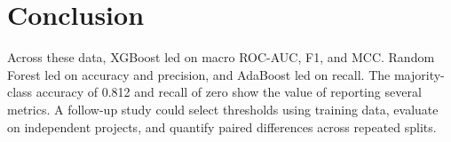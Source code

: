 \documentclass[conference]{IEEEtran}
\begin{document}
\section{Conclusion}
Across these data, XGBoost led on macro ROC-AUC, F1, and MCC. Random Forest led on accuracy and precision, and AdaBoost led on recall. The majority-class accuracy of 0.812 and recall of zero show the value of reporting several metrics. A follow-up study could select thresholds using training data, evaluate on independent projects, and quantify paired differences across repeated splits.


\end{document}
